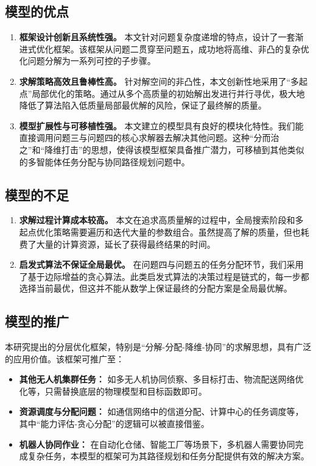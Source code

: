 \documentclass[12pt]{article}
\begin{document}
\begin{CJK}{UTF8}{gbsn}
		\subsection{模型的优点}
		\begin{enumerate}
			\item \textbf{框架设计创新且系统性强。} 本文针对问题复杂度递增的特点，设计了一套渐进式优化框架。该框架从问题二贯穿至问题五，成功地将高维、非凸的复杂优化问题分解为一系列可控的子步骤。
			
			\item \textbf{求解策略高效且鲁棒性高。} 针对解空间的非凸性，本文创新性地采用了“多起点”局部优化的策略。通过从多个高质量的初始解出发进行并行寻优，极大地降低了算法陷入低质量局部最优解的风险，保证了最终解的质量。
			
			\item \textbf{模型扩展性与可移植性强。} 本文建立的模型具有良好的模块化特性。我们能直接调用问题三与问题四的核心求解器去解决其他问题。这种“分而治之”和“降维打击”的思想，使得该模型框架具备推广潜力，可移植到其他类似的多智能体任务分配与协同路径规划问题中。
			
		\end{enumerate}
		
		\subsection{模型的不足}
		\begin{enumerate}
			\item \textbf{求解过程计算成本较高。} 本文在追求高质量解的过程中，全局搜索阶段和多起点优化策略需要遍历和迭代大量的参数组合。虽然提高了解的质量，但也耗费了大量的计算资源，延长了获得最终结果的时间。
			
			\item \textbf{启发式算法不保证全局最优。} 在问题四与问题五的任务分配环节，我们采用了基于边际增益的贪心算法。此类启发式算法的决策过程是链式的，每一步都选择当前最优，但这并不能从数学上保证最终的分配方案是全局最优解。
			
		\end{enumerate}
		
		\subsection{模型的推广}
		本研究提出的分层优化框架，特别是“分解-分配-降维-协同”的求解思想，具有广泛的应用价值。该框架可推广至：
		\begin{itemize}
			\item \textbf{其他无人机集群任务：} 如多无人机协同侦察、多目标打击、物流配送网络优化等，只需替换底层的物理模型和目标函数即可。
			\item \textbf{资源调度与分配问题：} 如通信网络中的信道分配、计算中心的任务调度等，其中“能力评估-贪心分配”的逻辑可以被直接借鉴。
			\item \textbf{机器人协同作业：} 在自动化仓储、智能工厂等场景下，多机器人需要协同完成复杂任务，本模型的框架可为其路径规划和任务分配提供有效的解决方案。
		\end{itemize}
		

\end{CJK}
\end{document}
